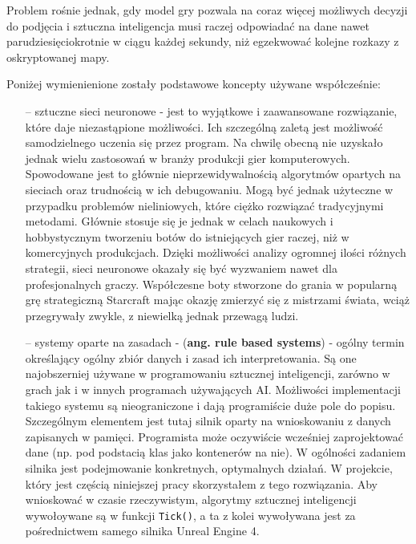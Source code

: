 \documentclass[12pt]{report}
\begin{document}
Problem rośnie jednak, gdy model gry pozwala na coraz więcej możliwych decyzji do podjęcia i sztuczna inteligencja musi raczej odpowiadać na dane nawet parudziesięciokrotnie w ciągu każdej sekundy, niż egzekwować kolejne rozkazy z oskryptowanej mapy. 

Poniżej wymienienione zostały podstawowe koncepty używane współcześnie:
\begin{itemize}
\item[--] sztuczne sieci neuronowe - jest to wyjątkowe i zaawansowane rozwiązanie, które daje niezastąpione możliwości. Ich szczególną zaletą jest możliwość samodzielnego uczenia się przez program. Na chwilę obecną nie uzyskało jednak wielu zastosowań w branży produkcji gier komputerowych. Spowodowane jest to głównie nieprzewidywalnością algorytmów opartych na sieciach oraz trudnością w ich debugowaniu. Mogą być jednak użyteczne w przypadku problemów nieliniowych, które ciężko rozwiązać tradycyjnymi metodami. Głównie stosuje się je jednak w celach naukowych i hobbystycznym tworzeniu botów do istniejących gier raczej, niż w komercyjnych produkcjach. Dzięki możliwości analizy ogromnej ilości różnych strategii, sieci neuronowe okazały się być wyzwaniem nawet dla profesjonalnych graczy. Współczesne boty stworzone do grania w popularną grę strategiczną Starcraft mając okazję zmierzyć się z mistrzami świata, wciąż przegrywały zwykle, z niewielką jednak przewagą ludzi.
\item[--]  systemy oparte na zasadach - (\textbf{ang. rule based systems}) - ogólny termin określający ogólny zbiór danych i zasad ich interpretowania. Są one najobszerniej używane w programowaniu sztucznej inteligencji, zarówno w grach jak i w innych programach używających AI. Możliwości implementacji takiego systemu są nieograniczone i dają programiście duże pole do popisu. Szczególnym elementem jest tutaj silnik oparty na wnioskowaniu z danych zapisanych w pamięci. Programista może oczywiście wcześniej zaprojektować dane (np. pod podstacią klas jako kontenerów na nie). W ogólności zadaniem silnika jest podejmowanie konkretnych, optymalnych działań. W projekcie, który jest częścią niniejszej pracy skorzystałem z tego rozwiązania. Aby wnioskować w czasie rzeczywistym, algorytmy sztucznej inteligencji wywołoywane są w funkcji \texttt{\texttt{Tick}()}, a ta z kolei wywoływana jest za pośrednictwem samego silnika Unreal Engine 4.

\end{itemize}
\end{document}
